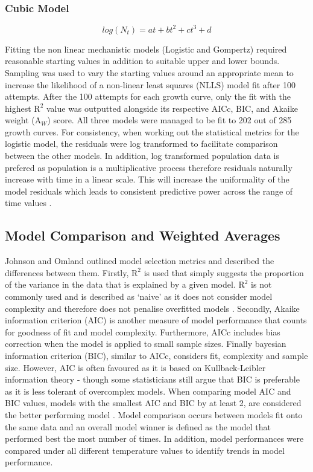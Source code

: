 \documentclass[12pt]{article}
\begin{document}
    \subsubsection{Cubic Model}
    \begin{equation}
        log(N_t) = at + bt^2 + ct^3 + d
    \end{equation}

Fitting the non linear mechanistic models (Logistic and Gompertz) required reasonable starting values in addition to suitable upper and lower bounds. Sampling was used to vary the starting values around an appropriate mean to increase the likelihood of a non-linear least squares (NLLS) model fit after 100 attempts. After the 100 attempts for each growth curve, only the fit with the highest $\mathrm{R}^2$ value was outputted alongside its respective AICc, BIC, and Akaike weight ($\mathrm{A}_{\textit{W}}$) score. All three models were managed to be fit to 202 out of 285 growth curves. For consistency, when working out the statistical metrics for the logistic model, the residuals were log transformed to facilitate comparison between the other models. In addition, log transformed population data is prefered as population is a multiplicative process therefore residuals naturally increase with time in a linear scale. This will increase the uniformality of the model residuals which leads to consistent predictive power across the range of time values \cite{Freckleton2002}.


    \subsection{Model Comparison and Weighted Averages}
Johnson and Omland outlined model selection metrics and described the differences between them. Firstly, $\mathrm{R}^2$ is used that simply suggests the proportion of the variance in the data that is explained by a given model. $\mathrm{R}^2$ is not commonly used and is described as `naive' as it does not consider model complexity and therefore does not penalise overfitted models \cite{JOHNSON2004101}. Secondly, Akaike information criterion (AIC) is another measure of model performance that counts for goodness of fit and model complexity. Furthermore, AICc includes bias correction when the model is applied to small sample sizes. Finally bayesian information criterion (BIC), similar to AICc, considers fit, complexity and sample size. However, AIC is often favoured as it is based on Kullback-Leibler information theory \cite{JOHNSON2004101} - though some statisticians still argue that BIC is preferable as it is less tolerant of overcomplex models. When comparing model AIC and BIC values, models with the smallest AIC and BIC by at least 2, are considered the better performing model \cite{JOHNSON2004101}. Model comparison occurs between models fit onto the same data and an overall model winner is defined as the model that performed best the most number of times. In addition, model performances were compared under all different temperature values to identify trends in model performance.\\
\end{document}
